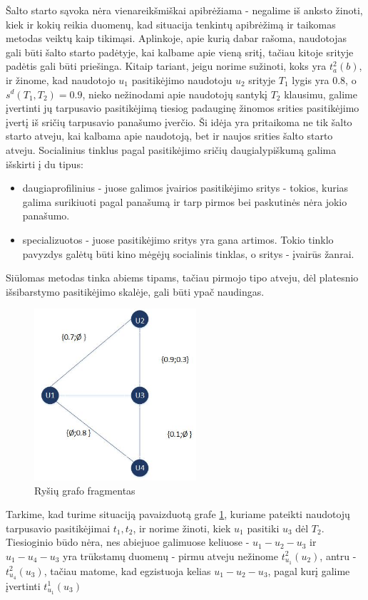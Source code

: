 \documentclass{VUMIFInfMagistrinis}
\begin{document}
Šalto starto sąvoka nėra vienareikšmiškai apibrėžiama - negalime iš anksto žinoti, kiek ir kokių reikia duomenų, kad situacija tenkintų apibrėžimą ir taikomas metodas veiktų kaip tikimąsi. Aplinkoje, apie kurią dabar rašoma, naudotojas gali būti šalto starto padėtyje, kai kalbame apie vieną sritį, tačiau kitoje srityje padėtis gali būti priešinga. Kitaip tariant, jeigu norime sužinoti, koks yra $t_a^2(b)$, ir žinome, kad naudotojo $u_1$ pasitikėjimo naudotoju $u_2$ srityje $T_1$ lygis yra $0.8$, o $s^d(T_1, T_2) = 0.9$, nieko nežinodami apie naudotojų santykį $T_2$ klausimu, galime įvertinti jų tarpusavio pasitikėjimą tiesiog padauginę žinomos srities pasitikėjimo įvertį iš sričių tarpusavio panašumo įverčio.
\newline
\indent
Ši idėja yra pritaikoma ne tik šalto starto atveju, kai kalbama apie naudotoją, bet ir naujos srities šalto starto atveju. Socialinius tinklus pagal pasitikėjimo sričių daugialypiškumą galima išskirti į du tipus:
\begin{itemize}
	\item daugiaprofilinius - juose galimos įvairios pasitikėjimo sritys - tokios, kurias galima surikiuoti pagal panašumą ir tarp pirmos bei paskutinės nėra jokio panašumo.
	\item specializuotos - juose pasitikėjimo sritys yra gana artimos. Tokio tinklo pavyzdys galėtų būti kino mėgėjų socialinis tinklas, o sritys - įvairūs žanrai. 
\end{itemize}
Siūlomas metodas tinka abiems tipams, tačiau pirmojo tipo atveju, dėl platesnio išsibarstymo pasitikėjimo skalėje, gali būti ypač naudingas.
\begin{figure}[ht!]
	\centering
	\includegraphics[width=60mm]{multiarea.jpg}
	\caption{Ryšių grafo fragmentas} \label{multiarea}
\end{figure}
Tarkime, kad turime situaciją pavaizduotą grafe \ref{multiarea}, kuriame pateikti naudotojų tarpusavio pasitikėjimai ${t_1, t_2}$, ir norime žinoti, kiek $u_1$ pasitiki $u_3$ dėl $T_2$. Tiesioginio būdo nėra, nes abiejuoe galimuose keliuose - $u_1 - u_2 - u_3$ ir $u_1 - u_4 - u_3$ yra trūkstamų duomenų - pirmu atveju nežinome $t_{u_1}^2(u_2)$, antru - $t_{u_4}^2(u_3)$, tačiau matome, kad egzistuoja kelias $u_1 - u_2 - u_3$, pagal kurį galime įvertinti $t_{u_1}^1(u_3)$
\end{document}
